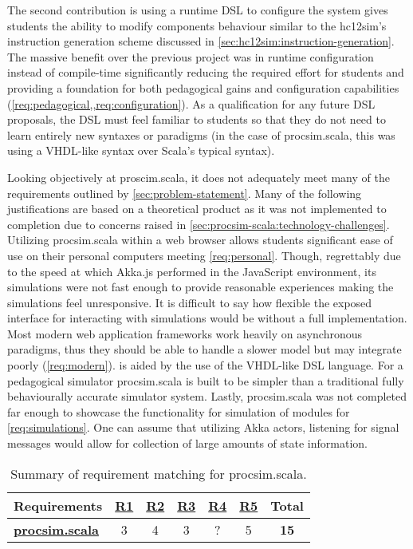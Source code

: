 The second contribution is using a runtime DSL to configure the system gives students the ability to modify components behaviour similar to the hc12sim's instruction generation scheme discussed in \cref{sec:hc12sim:instruction-generation}. The massive benefit over the previous project was in runtime configuration instead of compile-time significantly reducing the required effort for students and providing a foundation for both pedagogical gains and configuration capabilities (\cref{req:pedagogical,,req:configuration}). As a qualification for any future DSL proposals, the DSL must feel familiar to students so that they do not need to learn entirely new syntaxes or paradigms (in the case of procsim.scala, this was using a VHDL-like syntax over Scala's typical syntax). 

Looking objectively at proscim.scala, it does not adequately meet many of the requirements outlined by \cref{sec:problem-statement}. Many of the following justifications are based on a theoretical product as it was not implemented to completion due to concerns raised in \cref{sec:procsim-scala:technology-challenges}. Utilizing procsim.scala within a web browser allows students significant ease of use on their personal computers meeting \cref{req:personal}. Though, regrettably due to the speed at which Akka.js performed in the JavaScript environment, its simulations were not fast enough to provide reasonable experiences making the simulations feel unresponsive. It is difficult to say how flexible the exposed interface for interacting with simulations would be without a full implementation. Most modern web application frameworks work heavily on asynchronous paradigms, thus they should be able to handle a slower model but may integrate poorly (\cref{req:modern}).  is aided by the use of the VHDL-like DSL language. For a pedagogical simulator procsim.scala is built to be simpler than a traditional fully behaviourally accurate simulator system. Lastly, procsim.scala was not completed far enough to showcase the functionality for simulation of modules for \cref{req:simulations}. One can assume that utilizing Akka actors, listening for signal messages would allow for collection of large amounts of state information.

\begin{table}[h!]
    \centering
    \begin{tabular}{l|cccccc}
        \textbf{Requirements} & \textbf{\hyperref[req:personal]{R1}} & \textbf{\hyperref[req:configuration]{R2}} & \textbf{\hyperref[req:pedagogical]{R3}} & \textbf{\hyperref[req:simulations]{R4}} & \textbf{\hyperref[req:modern]{R5}} & \textbf{Total} \\ \hline
        \textbf{\hyperref[ch:scala-akka]{procsim.scala}} & 
            3 & 4 & 3 & ? & 5 & \textbf{15} \\
    \end{tabular}
    \caption{Summary of requirement matching for procsim.scala.}
\end{table}
